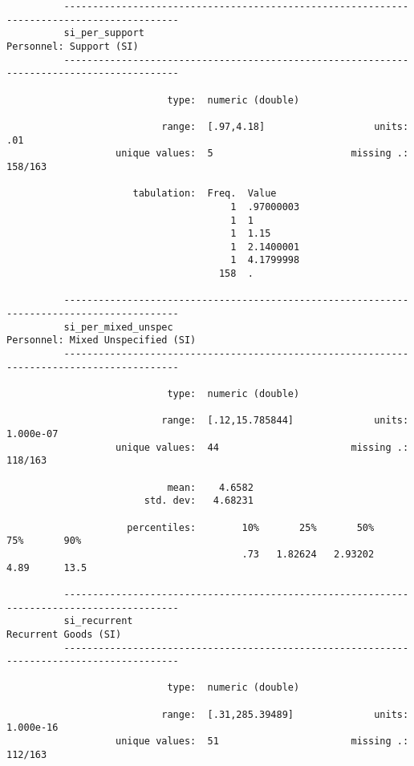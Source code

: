 \documentclass{article}
\begin{document}
\begin{verbatim}
          ------------------------------------------------------------------------------------------
          si_per_support                                                     Personnel: Support (SI)
          ------------------------------------------------------------------------------------------
          
                            type:  numeric (double)
          
                           range:  [.97,4.18]                   units:  .01
                   unique values:  5                        missing .:  158/163
          
                      tabulation:  Freq.  Value
                                       1  .97000003
                                       1  1
                                       1  1.15
                                       1  2.1400001
                                       1  4.1799998
                                     158  .
          
          ------------------------------------------------------------------------------------------
          si_per_mixed_unspec                                      Personnel: Mixed Unspecified (SI)
          ------------------------------------------------------------------------------------------
          
                            type:  numeric (double)
          
                           range:  [.12,15.785844]              units:  1.000e-07
                   unique values:  44                       missing .:  118/163
          
                            mean:    4.6582
                        std. dev:   4.68231
          
                     percentiles:        10%       25%       50%       75%       90%
                                         .73   1.82624   2.93202      4.89      13.5
          
          ------------------------------------------------------------------------------------------
          si_recurrent                                                          Recurrent Goods (SI)
          ------------------------------------------------------------------------------------------
          
                            type:  numeric (double)
          
                           range:  [.31,285.39489]              units:  1.000e-16
                   unique values:  51                       missing .:  112/163
          

\end{verbatim}
\end{document}
